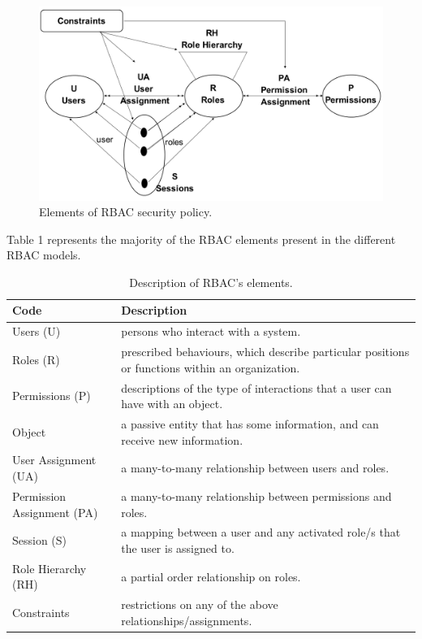 \begin{figure}[bht]
\centering
\includegraphics[scale=0.26]{RBACElements.png}
\caption{Elements of RBAC security policy.}
\label{fig:elelmRBAC}
\end{figure}

Table 1 represents the majority of the RBAC elements present in the different RBAC models.
\begin{table}[bth]
\centering
\caption{Description of RBAC's elements.}
\small
{}
\begin{tabular}{p{1.6 in} p{5.2 in}} \hline 
\hline
Code & Description\\\hline

Users (U)&  persons who interact with a system.\\
Roles (R)& prescribed behaviours, which describe particular positions or functions within an organization. \\
Permissions (P)& descriptions of the type of interactions that a user can have with an object.\\
Object& a passive entity that has some information, and   can receive new information.\\
User Assignment (UA)&a many-to-many relationship between users and roles.\\
Permission Assignment (PA)& a many-to-many relationship between permissions and roles.\\
Session (S)& a mapping between a user and any activated role/s that the user is assigned to.\\
Role Hierarchy (RH)& a partial order relationship on roles.\\
Constraints&restrictions on any of the above relationships/assignments.  \\ \hline\hline

\end{tabular}
\label{tab:namehere}


\end{table}


